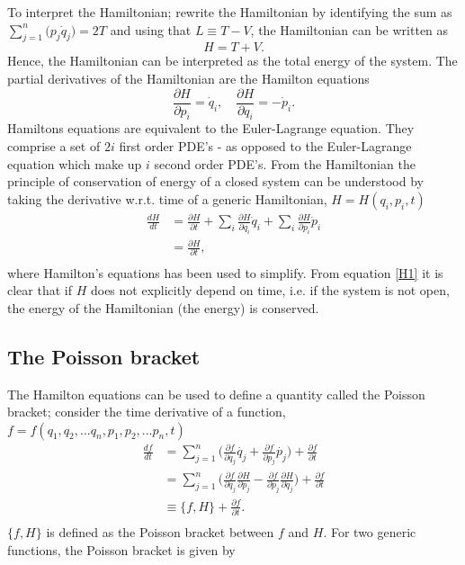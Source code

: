 To interpret the Hamiltonian; rewrite the Hamiltonian by identifying the sum as $\sum_{j=1}^{n}\big(p_j\dot{q}_j\big)=2T$ and using that $L\equiv T-V$, the Hamiltonian can be written as
\begin{equation}
	H=T+V.
\end{equation} 
Hence, the Hamiltonian can be interpreted as the total energy of the system. The partial derivatives of the Hamiltonian are the Hamilton equations
\begin{equation}
	\frac{\partial H}{\partial p_i}=\dot{q}_i, \quad \frac{\partial H}{\partial q_i}=-\dot{p}_i.
	\label{ham1}
\end{equation} 
Hamiltons equations are equivalent to the Euler-Lagrange equation. They comprise a set of $2i$ first order PDE's - as opposed to the Euler-Lagrange equation which make up $i$ second order PDE's. From the Hamiltonian the principle of conservation of energy of a closed system can be understood by taking the derivative w.r.t. time of a generic Hamiltonian, $H=H(q_i,p_i,t)$
\begin{equation}
	\begin{split}
		\frac{dH}{dt}&=\frac{\partial H}{\partial t}+\sum_i\frac{\partial H}{\partial q_i}\dot{q}_i+\sum_i\frac{\partial H}{\partial p_i}\dot{p}_i\\
		&=\frac{\partial H}{\partial t},\\
	\end{split}
	\label{H1}
\end{equation} 
where Hamilton's equations has been used to simplify. From equation \eqref{H1} it is clear that if $H$ does not explicitly depend on time, i.e. if the system is not open, the energy of the Hamiltonian (the energy) is conserved.

\subsection*{The Poisson bracket}
The Hamilton equations can be used to define a quantity called the Poisson bracket; consider the time derivative of a function, $f=f(q_1,q_2,...q_n,p_1,p_2,...p_n,t)$
\begin{equation}
	\begin{split}
		\frac{d f}{dt}
		&=\sum_{j=1}^{n}\bigg(\frac{\partial f}{\partial q_j}\dot{q_j}+\frac{\partial f}{\partial p_j}\dot{p_j}\bigg)+\frac{\partial f}{\partial t}\\
		&=\sum_{j=1}^{n}\bigg(\frac{\partial f}{\partial q_j}\frac{\partial H}{\partial p_j}-\frac{\partial f}{\partial p_j}\frac{\partial H}{\partial q_j}\bigg)+\frac{\partial f}{\partial t}\\
		&\equiv\{f,H\}+\frac{\partial f}{\partial t}.\\
	\end{split}
	\label{pois2}
\end{equation} 
$\{f,H\}$ is defined as the Poisson bracket between $f$ and $H$. For two generic functions, the Poisson bracket is given by

